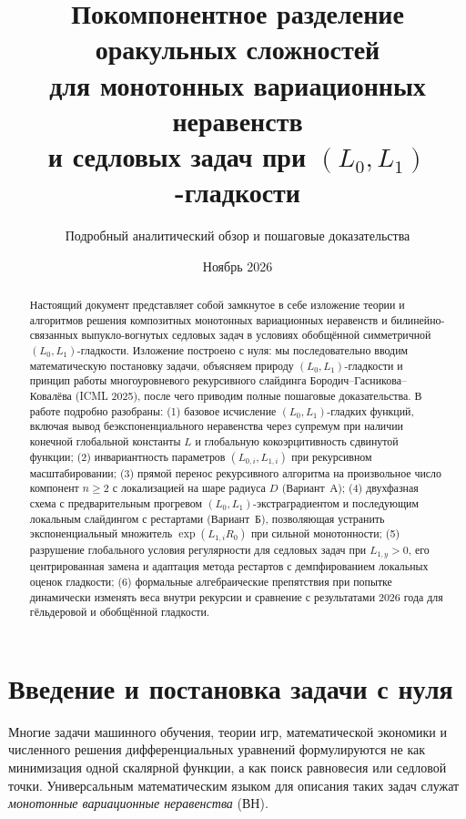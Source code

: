 \documentclass[11pt, a4paper]{article}
\title{\textbf{\color{accentblue}Покомпонентное разделение оракульных сложностей\\для монотонных вариационных неравенств\\и седловых задач при $(L_0, L_1)$-гладкости}}
\author{Подробный аналитический обзор и пошаговые доказательства}
\date{Ноябрь 2026}
\theoremstyle{definition}
\begin{document}
\maketitle

\begin{abstract}
Настоящий документ представляет собой замкнутое в себе изложение теории и алгоритмов решения композитных монотонных вариационных неравенств и билинейно-связанных выпукло-вогнутых седловых задач в условиях обобщённой симметричной $(L_0, L_1)$-гладкости. Изложение построено с нуля: мы последовательно вводим математическую постановку задачи, объясняем природу $(L_0, L_1)$-гладкости и принцип работы многоуровневого рекурсивного слайдинга Бородич--Гасникова--Ковалёва (ICML 2025), после чего приводим полные пошаговые доказательства. В работе подробно разобраны: (1) базовое исчисление $(L_0, L_1)$-гладких функций, включая вывод беэкспоненциального неравенства через супремум при наличии конечной глобальной константы $L$ и глобальную кокоэрцитивность сдвинутой функции; (2) инвариантность параметров $(L_{0,i}, L_{1,i})$ при рекурсивном масштабировании; (3) прямой перенос рекурсивного алгоритма на произвольное число компонент $n \ge 2$ с локализацией на шаре радиуса $D$ (Вариант~А); (4) двухфазная схема с предварительным прогревом $(L_0, L_1)$-экстраградиентом и последующим локальным слайдингом с рестартами (Вариант~Б), позволяющая устранить экспоненциальный множитель $\exp(L_{1,i} R_0)$ при сильной монотонности; (5) разрушение глобального условия регулярности для седловых задач при $L_{1,y} > 0$, его центрированная замена и адаптация метода рестартов с демпфированием локальных оценок гладкости; (6) формальные алгебраические препятствия при попытке динамически изменять веса внутри рекурсии и сравнение с результатами 2026 года для гёльдеровой и обобщённой гладкости.
\end{abstract}

\tableofcontents
\newpage

\section{Введение и постановка задачи с нуля}

Многие задачи машинного обучения, теории игр, математической экономики и численного решения дифференциальных уравнений формулируются не как минимизация одной скалярной функции, а как поиск равновесия или седловой точки. Универсальным математическим языком для описания таких задач служат \emph{монотонные вариационные неравенства} (ВН).
\end{document}
